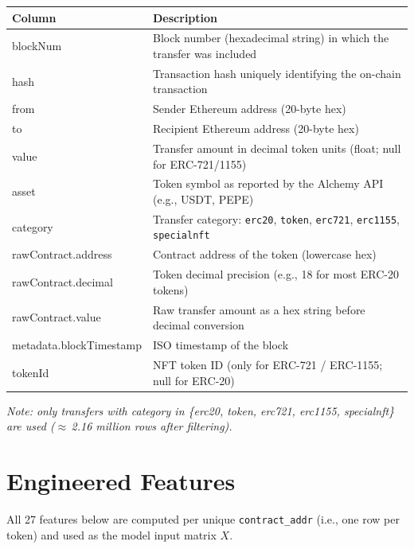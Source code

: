 \documentclass[11pt, a4paper]{article}
\begin{document}
\vspace{0.5em}
\begin{tabular}{>{\ttfamily}p{4.2cm} p{10cm}}
\toprule
\normalfont\textbf{Column} & \textbf{Description} \\
\midrule
blockNum          & Block number (hexadecimal string) in which the transfer was included \\
hash              & Transaction hash uniquely identifying the on-chain transaction \\
from              & Sender Ethereum address (20-byte hex) \\
to                & Recipient Ethereum address (20-byte hex) \\
value             & Transfer amount in decimal token units (float; null for ERC-721/1155) \\
asset             & Token symbol as reported by the Alchemy API (e.g., USDT, PEPE) \\
category          & Transfer category: \texttt{erc20}, \texttt{token}, \texttt{erc721}, \texttt{erc1155}, \texttt{specialnft} \\
rawContract.address & Contract address of the token (lowercase hex) \\
rawContract.decimal & Token decimal precision (e.g., 18 for most ERC-20 tokens) \\
rawContract.value  & Raw transfer amount as a hex string before decimal conversion \\
metadata.blockTimestamp & ISO timestamp of the block \\
tokenId           & NFT token ID (only for ERC-721 / ERC-1155; null for ERC-20) \\
\bottomrule
\end{tabular}

\vspace{0.5em}
\textit{Note: only transfers with category in \{erc20, token, erc721, erc1155, specialnft\}
are used ($\approx$\,2.16 million rows after filtering).}

\section{Engineered Features}

All 27 features below are computed per unique \texttt{contract\_addr}
(i.e., one row per token) and used as the model input matrix $X$.
\end{document}
